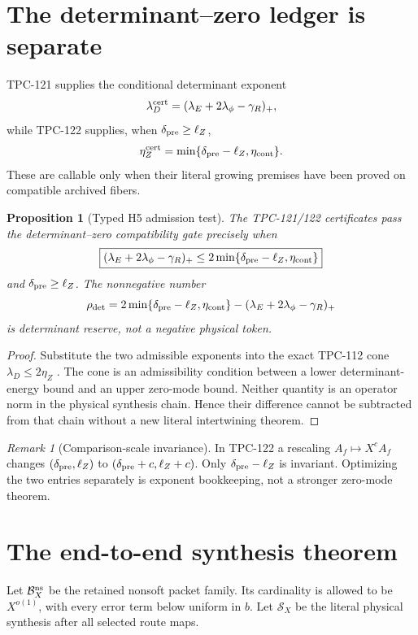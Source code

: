 \documentclass[11pt]{article}
\newtheorem{proposition}[theorem]{Proposition}
\theoremstyle{definition}
\theoremstyle{remark}
\newtheorem{remark}[theorem]{Remark}
\newcommand{\cB}{\mathcal B}
\begin{document}
\section{The determinant--zero ledger is separate}

TPC-121 supplies the conditional determinant exponent
\[
 \lambda_D^{\rm cert}
 =(\lambda_E+2\lambda_\phi-\gamma_R)_+,
\]
while TPC-122 supplies, when
\(\delta_{\rm pre}\ge\ell_Z\),
\[
 \eta_Z^{\rm cert}
 =\min\{\delta_{\rm pre}-\ell_Z,\eta_{\rm cont}\}.
\]
These are callable only when their literal growing premises have been
proved on compatible archived fibers.

\begin{proposition}[Typed H5 admission test]
\label{prop:h5}
The TPC-121/122 certificates pass the determinant--zero
compatibility gate precisely when
\[
 \boxed{
 (\lambda_E+2\lambda_\phi-\gamma_R)_+
 \le
 2\min\{\delta_{\rm pre}-\ell_Z,\eta_{\rm cont}\}}
\]
and \(\delta_{\rm pre}\ge\ell_Z\).  The nonnegative number
\[
 \rho_{\rm det}
 =
 2\min\{\delta_{\rm pre}-\ell_Z,\eta_{\rm cont}\}
 -
 (\lambda_E+2\lambda_\phi-\gamma_R)_+
\]
is determinant reserve, not a negative physical token.
\end{proposition}

\begin{proof}
Substitute the two admissible exponents into the exact TPC-112 cone
\(\lambda_D\le2\eta_Z\) \citep{WangTPC112}.  The cone is an
admissibility condition between a lower determinant-energy bound and
an upper zero-mode bound.  Neither quantity is an operator norm in
the physical synthesis chain.  Hence their difference cannot be
subtracted from that chain without a new literal intertwining
theorem.
\end{proof}

\begin{remark}[Comparison-scale invariance]
In TPC-122 a rescaling \(A_f\mapsto X^cA_f\) changes
\((\delta_{\rm pre},\ell_Z)\) to
\((\delta_{\rm pre}+c,\ell_Z+c)\).  Only
\(\delta_{\rm pre}-\ell_Z\) is invariant.  Optimizing the two entries
separately is exponent bookkeeping, not a stronger zero-mode theorem.
\end{remark}

\section{The end-to-end synthesis theorem}

Let \(\cB_X^{\rm ns}\) be the retained nonsoft packet family.  Its
cardinality is allowed to be \(X^{o(1)}\), with every error term below
uniform in \(b\).  Let \(\mathscr S_X\) be the literal physical
synthesis after all selected route maps.
\end{document}
